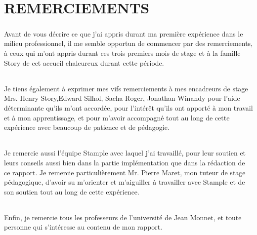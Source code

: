 \chapter{REMERCIEMENTS}
\paragraph{}
Avant de vous décrire ce que j'ai appris durant ma première expérience dans le milieu 
professionnel, il me semble opportun de commencer par des remerciements, à ceux qui m'ont 
appris durant ces trois premiers mois de stage et à la famille Story de cet accueil chaleureux 
durant cette période.
\subparagraph{}
Je tiens également à exprimer mes vifs remerciements à mes encadreurs de stage Mrs. Henry 
Story,Edward Silhol, Sacha Roger, Jonathan Winandy pour l'aide déterminante qu'ils m’ont accordée, pour l'intérêt qu'ils ont apporté à mon travail et 
à mon apprentissage, et pour m’avoir accompagné tout au long de cette expérience avec 
beaucoup de patience et de pédagogie.
\subparagraph{}
Je remercie aussi l'équipe Stample avec 
laquel j'ai travaillé, pour leur soutien et leurs conseils aussi bien dans la partie 
implémentation que dans la rédaction de ce rapport.
Je remercie particulièrement Mr. Pierre Maret, mon tuteur de stage pédagogique, d'avoir su 
m'orienter et m'aiguiller à travailler avec Stample et de son soutien tout au long de cette 
expérience.
\subparagraph{}
Enfin, je remercie tous les professeurs de l'université de Jean Monnet, et toute personne qui 
s'intéresse au contenu de mon rapport.